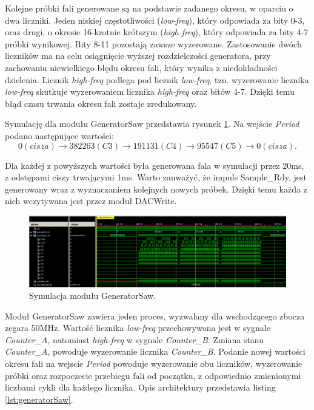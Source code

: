 \documentclass[a4paper,12pt]{article}
\begin{document}
Kolejne próbki fali generowane są na podstawie zadanego okresu, w oparciu o dwa liczniki. Jeden niskiej częstotliwości (\textit{low-freq}), który odpowiada za bity 0-3, oraz drugi, o okresie 16-krotnie krótszym (\textit{high-freq}), który odpowiada za bity 4-7 próbki wynikowej. Bity 8-11 pozostają zawsze wyzerowane. Zastosowanie dwóch liczników ma na celu osiągnięcie wyższej rozdzielczości generatora, przy zachowaniu niewielkiego błędu okresu fali, który wynika z niedokładności dzielenia. Licznik \textit{high-freq} podlega pod licznik \textit{low-freq}, tzn. wyzerowanie licznika \textit{low-freq} skutkuje wyzerowaniem licznika \textit{high-freq} oraz bitów 4-7. Dzięki temu błąd czasu trwania okresu fali zostaje zredukowany.

Symulację dla modułu GeneratorSaw przedstawia rysunek \ref{sim:gen_saw}. Na wejście \textit{Period} podano następujące wartości:
\begin{equation}
  0 (cisza) \rightarrow 382263 (C3) \rightarrow 191131 (C4) \rightarrow 95547 (C5) \rightarrow 0 (cisza).
\end{equation}

Dla każdej z powyższych wartości była generowana fala w symulacji przez 20ms, z odstępami ciszy trwającymi 1ms. Warto zauważyć, że impuls Sample\_Rdy, jest generowany wraz z wyznaczaniem kolejnych nowych próbek. Dzięki temu każda z nich wczytywana jest przez moduł DACWrite\cite{web:dacwrite}.

\begin{figure}[H]
  \centering
  \includegraphics[decodearray={1 0 1 0 1 0}, width=\linewidth]{images/generator_saw.png}
  \caption{Symulacja modułu GeneratorSaw.}
  \label{sim:gen_saw}
\end{figure}

Moduł GeneratorSaw zawiera jeden proces, wyzwalany dla wschodzącego zbocza zegara 50MHz. Wartość licznika \textit{low-freq} przechowywana jest w sygnale \textit{Counter\_A}, natomiast \textit{high-freq} w sygnale \textit{Counter\_B}. Zmiana stanu \textit{Counter\_A}, powoduje wyzerowanie licznika \textit{Counter\_B}. Podanie nowej wartości okresu fali na wejscie \textit{Period} powoduje wyzerowanie obu liczników, wyzerowanie próbki oraz rozpoczecie przebiegu fali od początku, z odpowiednio zmienionymi liczbami cykli dla każdego licznika.
Opis architektury przedstawia listing \ref{lst:generatorSaw}.
\end{document}
